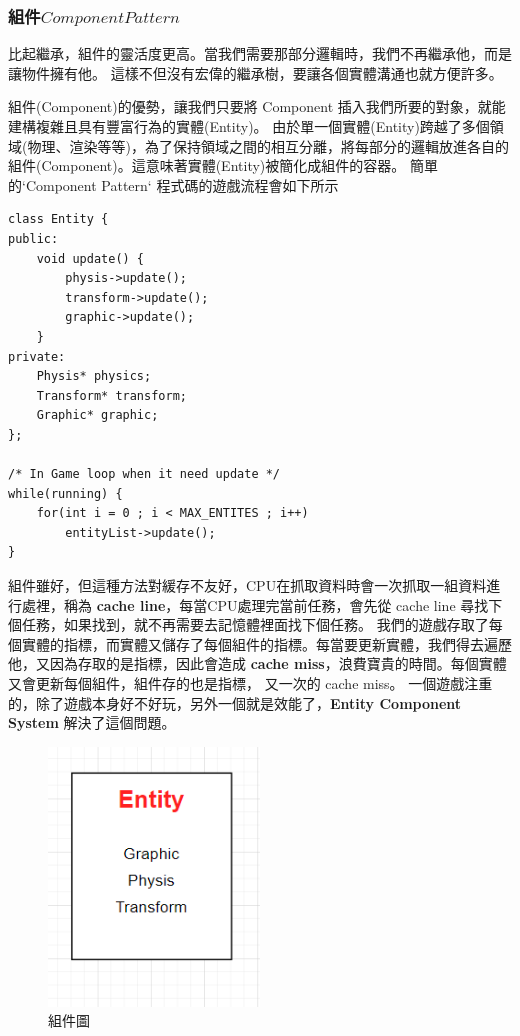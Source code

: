 \subsubsection{組件\(Component Pattern\)}

比起繼承，組件的靈活度更高。當我們需要那部分邏輯時，我們不再繼承他，而是讓物件擁有他。
這樣不但沒有宏偉的繼承樹，要讓各個實體溝通也就方便許多。

組件(Component)的優勢，讓我們只要將 Component 插入我們所要的對象，就能建構複雜且具有豐富行為的實體(Entity)。
由於單一個實體(Entity)跨越了多個領域(物理、渲染等等)，為了保持領域之間的相互分離，將每部分的邏輯放進各自的組件(Component)。這意味著實體(Entity)被簡化成組件的容器。
簡單的`Component Pattern` 程式碼的遊戲流程會如下所示

\begin{lstlisting}
class Entity {
public:
    void update() {
        physis->update();
        transform->update();
        graphic->update();
    }
private:
    Physis* physics;
    Transform* transform;
    Graphic* graphic;
};

/* In Game loop when it need update */
while(running) {
    for(int i = 0 ; i < MAX_ENTITES ; i++)
        entityList->update();
}
\end{lstlisting}

組件雖好，但這種方法對緩存不友好，CPU在抓取資料時會一次抓取一組資料進行處裡，稱為 \textbf{cache line}，每當CPU處理完當前任務，會先從 cache line 尋找下個任務，如果找到，就不再需要去記憶體裡面找下個任務。
我們的遊戲存取了每個實體的指標，而實體又儲存了每個組件的指標。每當要更新實體，我們得去遍歷他，又因為存取的是指標，因此會造成 \textbf{cache miss}，浪費寶貴的時間。每個實體又會更新每個組件，組件存的也是指標，
又一次的 cache miss。
一個遊戲注重的，除了遊戲本身好不好玩，另外一個就是效能了，\textbf{Entity Component System} 解決了這個問題。

\begin{figure}[h]
    \begin{center}
        \includegraphics[width=0.5\textwidth]{./resources/ecs/componentPattern.png}
    \end{center}
\caption{組件圖}
\label{fig:component}
\end{figure}

